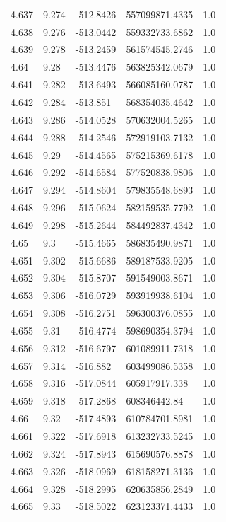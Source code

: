 \begin{tabular}{lllll}
4.637 & 9.274 & -512.8426 & 557099871.4335 & 1.0 \\
4.638 & 9.276 & -513.0442 & 559332733.6862 & 1.0 \\
4.639 & 9.278 & -513.2459 & 561574545.2746 & 1.0 \\
4.64 & 9.28 & -513.4476 & 563825342.0679 & 1.0 \\
4.641 & 9.282 & -513.6493 & 566085160.0787 & 1.0 \\
4.642 & 9.284 & -513.851 & 568354035.4642 & 1.0 \\
4.643 & 9.286 & -514.0528 & 570632004.5265 & 1.0 \\
4.644 & 9.288 & -514.2546 & 572919103.7132 & 1.0 \\
4.645 & 9.29 & -514.4565 & 575215369.6178 & 1.0 \\
4.646 & 9.292 & -514.6584 & 577520838.9806 & 1.0 \\
4.647 & 9.294 & -514.8604 & 579835548.6893 & 1.0 \\
4.648 & 9.296 & -515.0624 & 582159535.7792 & 1.0 \\
4.649 & 9.298 & -515.2644 & 584492837.4342 & 1.0 \\
4.65 & 9.3 & -515.4665 & 586835490.9871 & 1.0 \\
4.651 & 9.302 & -515.6686 & 589187533.9205 & 1.0 \\
4.652 & 9.304 & -515.8707 & 591549003.8671 & 1.0 \\
4.653 & 9.306 & -516.0729 & 593919938.6104 & 1.0 \\
4.654 & 9.308 & -516.2751 & 596300376.0855 & 1.0 \\
4.655 & 9.31 & -516.4774 & 598690354.3794 & 1.0 \\
4.656 & 9.312 & -516.6797 & 601089911.7318 & 1.0 \\
4.657 & 9.314 & -516.882 & 603499086.5358 & 1.0 \\
4.658 & 9.316 & -517.0844 & 605917917.338 & 1.0 \\
4.659 & 9.318 & -517.2868 & 608346442.84 & 1.0 \\
4.66 & 9.32 & -517.4893 & 610784701.8981 & 1.0 \\
4.661 & 9.322 & -517.6918 & 613232733.5245 & 1.0 \\
4.662 & 9.324 & -517.8943 & 615690576.8878 & 1.0 \\
4.663 & 9.326 & -518.0969 & 618158271.3136 & 1.0 \\
4.664 & 9.328 & -518.2995 & 620635856.2849 & 1.0 \\
4.665 & 9.33 & -518.5022 & 623123371.4433 & 1.0 \\

\end{tabular}
